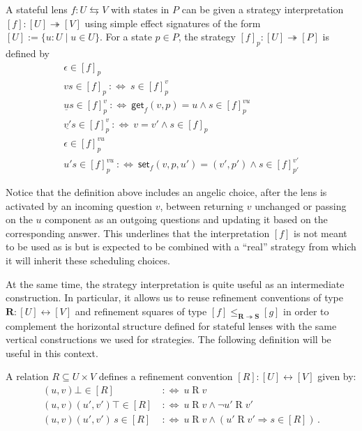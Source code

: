 \documentclass[acmsmall,screen,review,anonymous,nonacm]{acmart}
\newcommand{\kw}[1]{\ensuremath{ \mathsf{#1} }}
\begin{document}
\begin{definition}
A stateful lens $f : U \leftrightarrows V$ with states in $P$
can be given a strategy interpretation
$[f] : [U] \twoheadrightarrow [V]$
using simple effect signatures of the form
$[U] := \{u : U \mid u \in U\}$.
For a state $p \in P$,
the strategy $[f]_p : [U] \twoheadrightarrow [P]$ is defined by
\begin{gather*}
  \epsilon \in [f]_p \\
  vs \in [f]_p \::\Leftrightarrow\: s \in [f]_p^v \\
  \underline{u}s \in [f]_p^v \::\Leftrightarrow\:
    \kw{get}_f(v, p) = u \wedge s \in [f]_p^{vu} \\
  \underline{v'}s \in [f]_p^v \::\Leftrightarrow\:
    v = v' \wedge s \in [f]_p \\
  \epsilon \in [f]_p^{vu} \\
  u's \in [f]_p^{vu} \::\Leftrightarrow\:
    \kw{set}_f(v, p, u') = (v', p') \wedge
    s \in [f]_{p'}^{v'}
\end{gather*}
\end{definition}

Notice that the definition above
includes an angelic choice,
after the lens is activated by an incoming question $v$,
between returning $v$ unchanged
or passing on the $u$ component as an outgoing questions
and updating it based on the corresponding answer.
This underlines that the interpretation $[f]$
is not meant to be used as is
but is expected to be combined with a ``real'' strategy
from which it will inherit these scheduling choices.

At the same time,
the strategy interpretation
is quite useful as an intermediate construction.
In particular,
it allows us to reuse
refinement conventions of type
$\mathbf{R} : [U] \leftrightarrow [V]$
and refinement squares of type
$[f] \le_{\mathbf{R} \twoheadrightarrow \mathbf{S}} [g]$
in order to complement the horizontal structure
defined for stateful lenses
with the same vertical constructions we used for strategies.
The following definition will be useful in this context.

\begin{definition}
A relation $R \subseteq U \times V$ defines
a refinement convention $[R] : [U] \leftrightarrow [V]$ given by:
\begin{align*}
  (u, v)\bot \in [R] &\::\Leftrightarrow\:
    u \mathrel{R} v \\
  (u,v)(u',v')\top \in [R] &\::\Leftrightarrow\:
    u \mathrel{R} v \wedge \lnot u' \mathrel{R} v' \\
  (u,v)(u',v')\,s \in [R] &\::\Leftrightarrow\:
    u \mathrel{R} v \wedge (u' \mathrel{R} v' \Rightarrow s \in [R]) \,.
\end{align*}
\end{definition}
\end{document}
